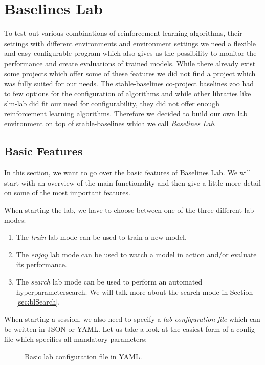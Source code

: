 \section{Baselines Lab} \label{sec:BaselinesLab}
To test out various combinations of reinforcement learning algorithms, their settings with different environments and environment settings we need a flexible and easy configurable program which also gives us the possibility to monitor the performance and create evaluations of trained models. While there already exist some projects which offer some of these features we did not find a project which was fully suited for our needs. The stable-baselines co-project baselines zoo \cite{rl-zoo} had to few options for the configuration of algorithms and while other libraries like slm-lab \cite{kenggraesser2017slmlab} did fit our need for configurability, they did not offer enough reinforcement learning algorithms. Therefore we decided to build our own lab environment on top of stable-baselines which we call \textit{Baselines Lab}.

\subsection{Basic Features} \label{sec:blFunctions}
In this section, we want to go over the basic features of Baselines Lab. We will start with an overview of the main functionality and then give a little more detail on some of the most important features. 

When starting the lab, we have to choose between one of the three different lab modes:

\begin{enumerate}
    \item The \textit{train} lab mode can be used to train a new model.
    \item The \textit{enjoy} lab mode can be used to watch a model in action and/or evaluate its performance.
    \item The \textit{search} lab mode can be used to perform an automated hyperparametersearch. We will talk more about the search mode in Section \ref{sec:blSearch}.
\end{enumerate}

When starting a session, we also need to specify a \textit{lab configuration file} which can be written in JSON or YAML. Let us take a look at the easiest form of a config file which specifies all mandatory parameters:

\begin{figure}[h]
    
    \caption[Basic lab configuration file]{Basic lab configuration file in YAML.}
    \label{fig:BasicLabConfig}
\end{figure}



